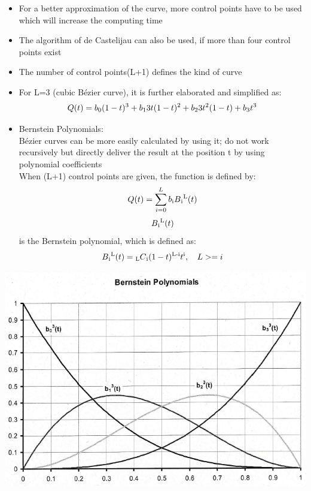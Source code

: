 \documentclass[12pt]{article}
\begin{document}
\begin{itemize}
	\begin{itemize}
		\item For a better approximation of the curve, more control points have to be used which will increase the computing time
		\item The algorithm of de Castelijau can also be used, if more than four control points exist
		\item The number of control points(L+1) defines the kind of curve
		\item For L=3 (cubic B\'ezier curve), it is further elaborated and simplified as:
		\begin{equation}
			Q(t) = b\textsubscript{0}(1-t)\textsuperscript{3}+b\textsubscript{1}3t(1-t)\textsuperscript{2}+b\textsubscript{2}3t\textsuperscript{2}(1-t)+b\textsubscript{3}t\textsuperscript{3}
		\end{equation}
		\item Bernstein Polynomials: \\
		B\'ezier curves can be more easily calculated by using it; do not work recursively but directly deliver the result at the position t by using polynomial coefficients \\
		When (L+1) control points are given, the function is defined by:
		\begin{equation}
			Q(t) = \sum_{i=0}^Lb\textsubscript{i} B\textsubscript{i}\textsuperscript{L}(t)
		\end{equation}
		$$ B\textsubscript{i}\textsuperscript{L}(t) $$ is the Bernstein polynomial, which is defined as:
		\begin{equation}
			B\textsubscript{i}\textsuperscript{L}(t)= \textsubscript{L}C\textsubscript{i} (1-t)\textsuperscript{L-i}t\textsuperscript{i}, \quad L >=i
		\end{equation}
	\end{itemize}
	\includegraphics[scale=0.65]{3_31}

\end{itemize}
\end{document}
